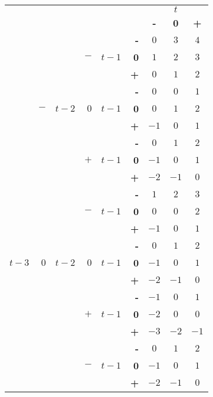 \documentclass{article}[]
\begin{document}
\begin{center}
\begin{tabular}{r | r | r | r | r | r | c c c | }
 \multicolumn{5}{r}{} & \multicolumn{1}{r}{} &	\multicolumn{3}{c}{$t$} \\ \cline{7-9}
 \multicolumn{5}{r}{} & 		& \textbf{-} & \textbf{0} & \textbf{+} \\ \cline{2-2} \cline{4-4} \cline{6-9}

&&&&& \textbf{-}            & $0$	& $3$	& $4$ \\ 
&&&$-$&$t-1$& \textbf{0}    & $1$	& $2$	& $3$	\\
&&&&&\textbf{+}             & $0$	& $1$	& $2$ \\ \cline{4-4} \cline{6-9}

&&&&&\textbf{-}             & $0$	& $0$	& $1$ \\ 
&$-$&$t-2$&$0$&$t-1$&\textbf{0} & $0$	& $1$	& $2$	\\
&&&&&\textbf{+}                 & $-1$	& $0$	& $1$ \\  \cline{4-4} \cline{6-9}

&&&&&\textbf{-}                 & $0$	& $1$	& $2$ \\ 
&&&$+$   &$t-1$ & \textbf{0}    & $-1$	& $0$	& $1$	\\
&&&&&\textbf{+}                 & $-2$	& $-1$	& $0$ \\ \cline{2-2} \cline{4-4} \cline{6-9}

&&&&& \textbf{-}                    & $1$	& $2$	& $3$ \\ 
&&&$-$&$t-1$&\textbf{0}             & $0$	& $0$	& $2$	\\
&&&&&\textbf{+}                     & $-1$	& $0$	& $1$ \\ \cline{4-4} \cline{6-9}

&&&&&\textbf{-}                     & $0$	& $1$	& $2$ \\ 
$t-3$&$0$&$t-2$&$0$&$t-1$&\textbf{0}& $-1$	& $0$	& $1$	\\
&&&&&\textbf{+}                     & $-2$	& $-1$	& $0$ \\ \cline{4-4} \cline{6-9}

&&&&&\textbf{-}                     & $-1$	& $0$	& $1$ \\ 
&&&$+$   &$t-1$ & \textbf{0}        & $-2$	& $0$	& $0$	\\
&&&&&\textbf{+}                     & $-3$	& $-2$	& $-1$ \\ \cline{2-2} \cline{4-4} \cline{6-9}

& &     &	&	&    \textbf{-}     & $0$	& $1$	& $2$ \\ 
&&&  $-$ &$t-1$ & \textbf{0}        & $-1$	& $0$	& $1$	\\
&&&&&\textbf{+}                     & $-2$	& $-1$	& $0$ \\ \cline{4-4} \cline{6-9}


\end{tabular}
\end{center}
\end{document}

